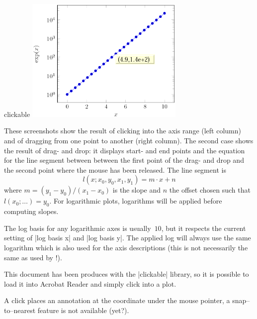 \begin{pgfplotslibrary}{clickable}
	\includegraphics[height=6cm]{figures/pgfplotsclickable-fig3.png}
	\hfill

	\nobreak
	These screenshots show the result of clicking into the axis range (left column) and of dragging from one point to another (right column). The second case shows the result of drag- and drop: it displays start- and end points and the equation for the line segment between between the first point of the drag- and drop and the second point where the mouse has been released. The line segment is 
	\[ l(x; x_0,y_0,x_1,y_1) = m \cdot x + n \]
	where $m = (y_1-y_0) / (x_1-x_0)$ is the slope and $n$ the offset chosen such that $l(x_0;\dotsc) = y_0$. For logarithmic plots, logarithms will be applied before computing slopes. 
	
	The log basis for any logarithmic axes is usually~$10$, but it respects the current setting of |log basis x| and |log basis y|. The applied log will always use the same logarithm which is also used for the axis descriptions (this is not necessarily the same as used by \PGFPlotstable!).

	This document has been produces with the |clickable| library, so it is possible to load it into Acrobat Reader and simply click into a plot.

	A click places an annotation at the coordinate under the mouse pointer, a snap--to--nearest feature is not available (yet?).


\end{pgfplotslibrary}
